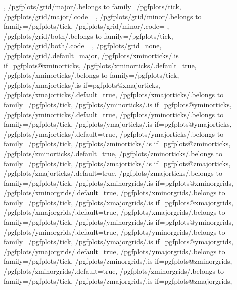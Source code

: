 {{		\pgfplots@zminorgridsfalse
		\pgfplots@xmajorgridsfalse
		\pgfplots@ymajorgridsfalse
		\pgfplots@zmajorgridsfalse
	},
	/pgfplots/grid/major/.belongs to family=/pgfplots/tick,
	/pgfplots/grid/major/.code={%
		\pgfplots@xminorgridsfalse
		\pgfplots@yminorgridsfalse
		\pgfplots@zminorgridsfalse
		\pgfplots@xmajorgridstrue
		\pgfplots@ymajorgridstrue
		\pgfplots@zmajorgridstrue
	},
	/pgfplots/grid/minor/.belongs to family=/pgfplots/tick,
	/pgfplots/grid/minor/.code={%
		\pgfplots@xminorgridstrue
		\pgfplots@yminorgridstrue
		\pgfplots@zminorgridstrue
		\pgfplots@xmajorgridsfalse
		\pgfplots@ymajorgridsfalse
		\pgfplots@zmajorgridsfalse
	},
	/pgfplots/grid/both/.belongs to family=/pgfplots/tick,
	/pgfplots/grid/both/.code={%
		\pgfplots@xminorgridstrue
		\pgfplots@yminorgridstrue
		\pgfplots@zminorgridstrue
		\pgfplots@xmajorgridstrue
		\pgfplots@ymajorgridstrue
		\pgfplots@zmajorgridstrue
	},
	/pgfplots/grid=none,
	/pgfplots/grid/.default=major,
	/pgfplots/xminorticks/.is if=pgfplots@xminorticks,
	/pgfplots/xminorticks/.default=true,
	/pgfplots/xminorticks/.belongs to family=/pgfplots/tick,
	/pgfplots/xmajorticks/.is if=pgfplots@xmajorticks,
	/pgfplots/xmajorticks/.default=true,
	/pgfplots/xmajorticks/.belongs to family=/pgfplots/tick,
	/pgfplots/yminorticks/.is if=pgfplots@yminorticks,
	/pgfplots/yminorticks/.default=true,
	/pgfplots/yminorticks/.belongs to family=/pgfplots/tick,
	/pgfplots/ymajorticks/.is if=pgfplots@ymajorticks,
	/pgfplots/ymajorticks/.default=true,
	/pgfplots/ymajorticks/.belongs to family=/pgfplots/tick,
	/pgfplots/zminorticks/.is if=pgfplots@zminorticks,
	/pgfplots/zminorticks/.default=true,
	/pgfplots/zminorticks/.belongs to family=/pgfplots/tick,
	/pgfplots/zmajorticks/.is if=pgfplots@zmajorticks,
	/pgfplots/zmajorticks/.default=true,
	/pgfplots/zmajorticks/.belongs to family=/pgfplots/tick,
	/pgfplots/xminorgrids/.is if=pgfplots@xminorgrids,
	/pgfplots/xminorgrids/.default=true,
	/pgfplots/xminorgrids/.belongs to family=/pgfplots/tick,
	/pgfplots/xmajorgrids/.is if=pgfplots@xmajorgrids,
	/pgfplots/xmajorgrids/.default=true,
	/pgfplots/xmajorgrids/.belongs to family=/pgfplots/tick,
	/pgfplots/yminorgrids/.is if=pgfplots@yminorgrids,
	/pgfplots/yminorgrids/.default=true,
	/pgfplots/yminorgrids/.belongs to family=/pgfplots/tick,
	/pgfplots/ymajorgrids/.is if=pgfplots@ymajorgrids,
	/pgfplots/ymajorgrids/.default=true,
	/pgfplots/ymajorgrids/.belongs to family=/pgfplots/tick,
	/pgfplots/zminorgrids/.is if=pgfplots@zminorgrids,
	/pgfplots/zminorgrids/.default=true,
	/pgfplots/zminorgrids/.belongs to family=/pgfplots/tick,
	/pgfplots/zmajorgrids/.is if=pgfplots@zmajorgrids,
}
